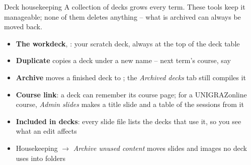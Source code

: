
\begin{standardframe}{Deck housekeeping}
	\small
	A collection of decks grows every term. These tools keep it manageable;
	none of them deletes anything -- what is archived can always be moved back.
	\par\medskip
	\begin{itemize}
		\item \textbf{The workdeck}, : your scratch deck, always at the top of the deck table
		\item \textbf{Duplicate} copies a deck under a new name -- next term's course, say
		\item \textbf{Archive} moves a finished deck to ; the \emph{Archived decks} tab still compiles it
		\item \textbf{Course link}: a deck can remember its course page; for a UNIGRAZonline course, \emph{Admin slides} makes a title slide and a table of the sessions from it
		\item \textbf{Included in decks}: every slide file lists the decks that use it, so you see what an edit affects
		\item Housekeeping $\rightarrow$ \emph{Archive unused content} moves slides and images no deck uses into  folders
	\end{itemize}
\end{standardframe}
